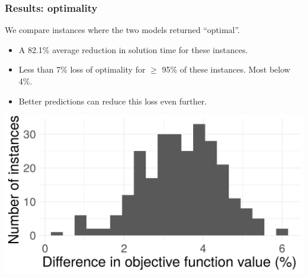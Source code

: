 \begin{frame}
\frametitle{\textbf{Results: optimality}}
  \begin{block}{}
    We compare instances where the two models returned ``optimal''.
  \end{block}{}
  
  \begin{itemize}[<+->]    
    \item A 82.1\% average reduction in solution time for these instances.
    \item Less than 7\% loss of optimality for $\ge$ 95\% of these instances. Most below 4\%.
    \item Better predictions can reduce this loss even further.
  \end{itemize}

  \includegraphics[width=0.8\linewidth]{images/quality_degradation_2tasks}

\end{frame}

